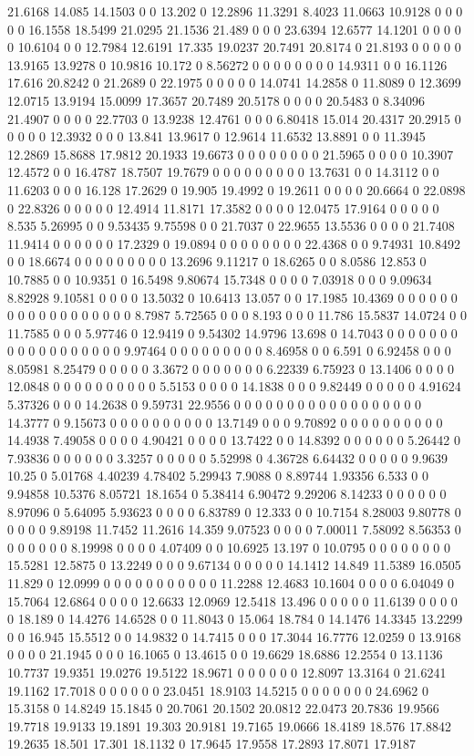 21.6168 14.085 14.1503 0 0 13.202 0 12.2896 11.3291 8.4023 11.0663 10.9128 0 0 0 0 0 16.1558 18.5499 21.0295 21.1536 21.489 0 0 0 23.6394 12.6577 14.1201 0 0 0 0 0 10.6104 0 0 12.7984 12.6191 17.335 19.0237 20.7491 20.8174 0 21.8193 0 0 0 0 0 13.9165 13.9278 0 10.9816 10.172 0 8.56272 0 0 0 0 0 0 0 0 14.9311 0 0 16.1126 17.616 20.8242 0 21.2689 0 22.1975 0 0 0 0 0 14.0741 14.2858 0 11.8089 0 12.3699 12.0715 13.9194 15.0099 17.3657 20.7489 20.5178 0 0 0 0 20.5483 0 8.34096 21.4907 0 0 0 0 22.7703 0 13.9238 12.4761 0 0 0 6.80418 15.014 20.4317 20.2915 0 0 0 0 0 12.3932 0 0 0 13.841 13.9617 0 12.9614 11.6532 13.8891 0 0 11.3945 12.2869 15.8688 17.9812 20.1933 19.6673 0 0 0 0 0 0 0 0 21.5965 0 0 0 0 10.3907 12.4572 0 0 16.4787 18.7507 19.7679 0 0 0 0 0 0 0 0 0 13.7631 0 0 14.3112 0 0 11.6203 0 0 0 16.128 17.2629 0 19.905 19.4992 0 19.2611 0 0 0 0 20.6664 0 22.0898 0 22.8326 0 0 0 0 0 12.4914 11.8171 17.3582 0 0 0 0 12.0475 17.9164 0 0 0 0 0 8.535 5.26995 0 0 9.53435 9.75598 0 0 21.7037 0 22.9655 13.5536 0 0 0 0 21.7408 11.9414 0 0 0 0 0 0 17.2329 0 19.0894 0 0 0 0 0 0 0 0 22.4368 0 0 9.74931 10.8492 0 0 18.6674 0 0 0 0 0 0 0 0 0 13.2696 9.11217 0 18.6265 0 0 8.0586 12.853 0 10.7885 0 0 10.9351 0 16.5498 9.80674 15.7348 0 0 0 0 7.03918 0 0 0 9.09634 8.82928 9.10581 0 0 0 0 13.5032 0 10.6413 13.057 0 0 17.1985 10.4369 0 0 0 0 0 0 0 0 0 0 0 0 0 0 0 0 0 0 8.7987 5.72565 0 0 0 8.193 0 0 0 11.786 15.5837 14.0724 0 0 11.7585 0 0 0 5.97746 0 12.9419 0 9.54302 14.9796 13.698 0 14.7043 0 0 0 0 0 0 0 0 0 0 0 0 0 0 0 0 0 0 9.97464 0 0 0 0 0 0 0 0 0 8.46958 0 0 6.591 0 6.92458 0 0 0 8.05981 8.25479 0 0 0 0 0 3.3672 0 0 0 0 0 0 0 6.22339 6.75923 0 13.1406 0 0 0 0 12.0848 0 0 0 0 0 0 0 0 0 0 5.5153 0 0 0 0 14.1838 0 0 0 9.82449 0 0 0 0 0 4.91624 5.37326 0 0 0 14.2638 0 9.59731 22.9556 0 0 0 0 0 0 0 0 0 0 0 0 0 0 0 0 0 0 14.3777 0 9.15673 0 0 0 0 0 0 0 0 0 0 13.7149 0 0 0 9.70892 0 0 0 0 0 0 0 0 0 0 14.4938 7.49058 0 0 0 0 4.90421 0 0 0 0 13.7422 0 0 14.8392 0 0 0 0 0 0 5.26442 0 7.93836 0 0 0 0 0 0 3.3257 0 0 0 0 0 5.52998 0 4.36728 6.64432 0 0 0 0 0 9.9639 10.25 0 5.01768 4.40239 4.78402 5.29943 7.9088 0 8.89744 1.93356 6.533 0 0 9.94858 10.5376 8.05721 18.1654 0 5.38414 6.90472 9.29206 8.14233 0 0 0 0 0 0 8.97096 0 5.64095 5.93623 0 0 0 0 6.83789 0 12.333 0 0 10.7154 8.28003 9.80778 0 0 0 0 0 9.89198 11.7452 11.2616 14.359 9.07523 0 0 0 0 7.00011 7.58092 8.56353 0 0 0 0 0 0 0 8.19998 0 0 0 0 4.07409 0 0 10.6925 13.197 0 10.0795 0 0 0 0 0 0 0 0 15.5281 12.5875 0 13.2249 0 0 0 9.67134 0 0 0 0 0 14.1412 14.849 11.5389 16.0505 11.829 0 12.0999 0 0 0 0 0 0 0 0 0 0 0 11.2288 12.4683 10.1604 0 0 0 0 6.04049 0 15.7064 12.6864 0 0 0 0 12.6633 12.0969 12.5418 13.496 0 0 0 0 0 11.6139 0 0 0 0 0 18.189 0 14.4276 14.6528 0 0 11.8043 0 15.064 18.784 0 14.1476 14.3345 13.2299 0 0 16.945 15.5512 0 0 14.9832 0 14.7415 0 0 0 17.3044 16.7776 12.0259 0 13.9168 0 0 0 0 21.1945 0 0 0 16.1065 0 13.4615 0 0 19.6629 18.6886 12.2554 0 13.1136 10.7737 19.9351 19.0276 19.5122 18.9671 0 0 0 0 0 0 12.8097 13.3164 0 21.6241 19.1162 17.7018 0 0 0 0 0 0 23.0451 18.9103 14.5215 0 0 0 0 0 0 0 24.6962 0 15.3158 0 14.8249 15.1845 0 20.7061 20.1502 20.0812 22.0473 20.7836 19.9566 19.7718 19.9133 19.1891 19.303 20.9181 19.7165 19.0666 18.4189 18.576 17.8842 19.2635 18.501 17.301 18.1132 0 17.9645 17.9558 17.2893 17.8071 17.9187 